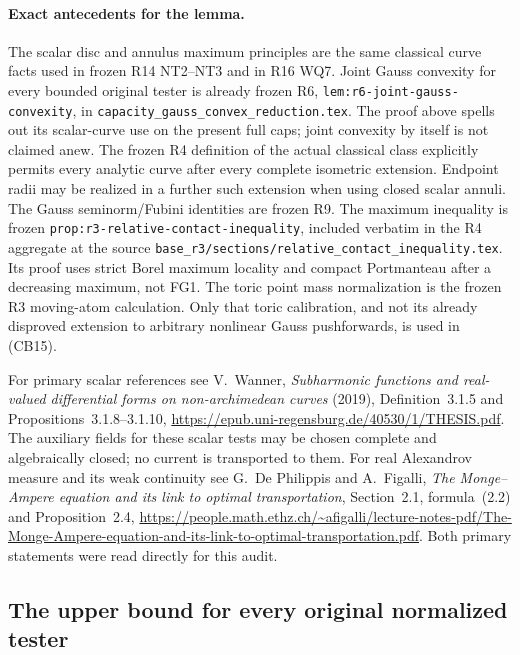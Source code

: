 \paragraph{Exact antecedents for the lemma.}
The scalar disc and annulus maximum principles are the same
classical curve facts used in frozen R14 NT2--NT3 and in R16
WQ7. Joint Gauss convexity for every bounded original tester is
already frozen R6,
\texttt{lem:r6-joint-gauss-convexity}, in
\texttt{capacity\_gauss\_convex\_reduction.tex}. The proof above
spells out its scalar-curve use on the present full caps; joint
convexity by itself is not claimed anew. The frozen R4 definition
of the actual classical class explicitly permits every analytic
curve after every complete isometric extension. Endpoint radii
may be realized in a further such extension when using closed
scalar annuli. The Gauss seminorm/Fubini identities are frozen R9.
The maximum inequality is frozen
\texttt{prop:r3-relative-contact-inequality}, included verbatim
in the R4 aggregate at the source
\texttt{base\_r3/sections/relative\_contact\_inequality.tex}.
Its proof uses strict Borel maximum locality and compact
Portmanteau after a decreasing maximum, not FG1. The toric
point mass normalization is the frozen R3 moving-atom
calculation. Only that toric calibration, and not its already
disproved extension to arbitrary nonlinear Gauss pushforwards,
is used in (CB15).

For primary scalar references see V.~Wanner,
\emph{Subharmonic functions and real-valued differential forms on
non-archimedean curves} (2019), Definition~3.1.5 and
Propositions~3.1.8--3.1.10,
\url{https://epub.uni-regensburg.de/40530/1/THESIS.pdf}.
The auxiliary fields for these scalar tests may be chosen complete
and algebraically closed; no current is transported to them.
For real Alexandrov measure and its weak continuity see
G.~De Philippis and A.~Figalli,
\emph{The Monge--Ampere equation and its link to optimal
transportation}, Section~2.1, formula~(2.2) and Proposition~2.4,
\url{https://people.math.ethz.ch/~afigalli/lecture-notes-pdf/The-Monge-Ampere-equation-and-its-link-to-optimal-transportation.pdf}.
Both primary statements were read directly for this audit.

\subsection{The upper bound for every original normalized tester}


